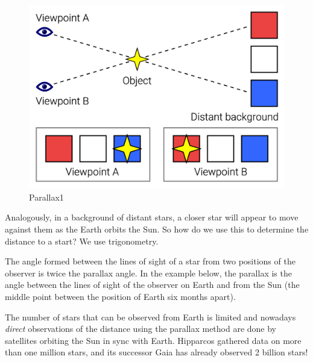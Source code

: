 \documentclass[
  letterpaper,
  DIV=11,
  numbers=noendperiod]{scrreprt}
\begin{document}
\begin{figure}

{\centering \includegraphics{img/Parallax_Example.png}

}

\caption{Parallax1}

\end{figure}

Analogously, in a background of distant stars, a closer star will appear
to move against them as the Earth orbits the Sun. So how do we use this
to determine the distance to a start? We use trigonometry.

The angle formed between the lines of sight of a star from two positions
of the observer is twice the parallax angle. In the example below, the
parallax is the angle between the lines of sight of the observer on
Earth and from the Sun (the middle point between the position of Earth
six months apart).

The number of stars that can be observed from Earth is limited and
nowadays \emph{direct} observations of the distance using the parallax
method are done by satellites orbiting the Sun in sync with Earth.
Hipparcos gathered data on more than one million stars, and its
successor Gaia has already observed 2 billion stars!
\end{document}

